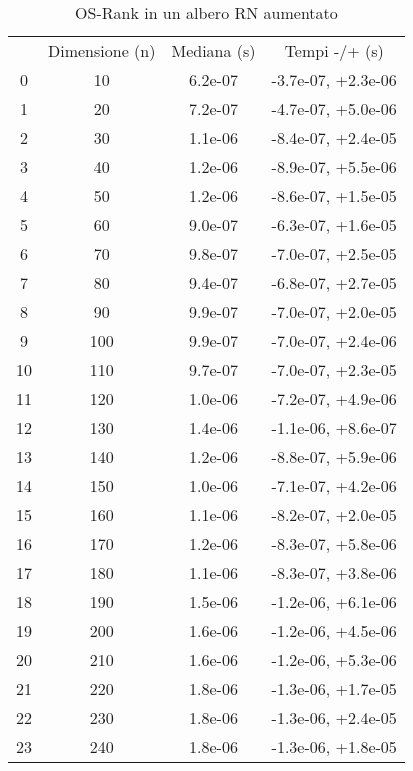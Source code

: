 \begin{table}
\centering
\caption{OS-Rank in un albero RN aumentato}
\label{OS-Rank in un albero RN aumentato}
\begin{adjustbox}{width=1\textwidth/2}
\begin{tabular}{|c|c|c|c|}
\hline
 & Dimensione (n) & Mediana (s) & Tempi -/+ (s) \\
0 & 10 & 6.2e-07 & -3.7e-07, +2.3e-06 \\
\cline{1-4}
1 & 20 & 7.2e-07 & -4.7e-07, +5.0e-06 \\
\cline{1-4}
2 & 30 & 1.1e-06 & -8.4e-07, +2.4e-05 \\
\cline{1-4}
3 & 40 & 1.2e-06 & -8.9e-07, +5.5e-06 \\
\cline{1-4}
4 & 50 & 1.2e-06 & -8.6e-07, +1.5e-05 \\
\cline{1-4}
5 & 60 & 9.0e-07 & -6.3e-07, +1.6e-05 \\
\cline{1-4}
6 & 70 & 9.8e-07 & -7.0e-07, +2.5e-05 \\
\cline{1-4}
7 & 80 & 9.4e-07 & -6.8e-07, +2.7e-05 \\
\cline{1-4}
8 & 90 & 9.9e-07 & -7.0e-07, +2.0e-05 \\
\cline{1-4}
9 & 100 & 9.9e-07 & -7.0e-07, +2.4e-06 \\
\cline{1-4}
10 & 110 & 9.7e-07 & -7.0e-07, +2.3e-05 \\
\cline{1-4}
11 & 120 & 1.0e-06 & -7.2e-07, +4.9e-06 \\
\cline{1-4}
12 & 130 & 1.4e-06 & -1.1e-06, +8.6e-07 \\
\cline{1-4}
13 & 140 & 1.2e-06 & -8.8e-07, +5.9e-06 \\
\cline{1-4}
14 & 150 & 1.0e-06 & -7.1e-07, +4.2e-06 \\
\cline{1-4}
15 & 160 & 1.1e-06 & -8.2e-07, +2.0e-05 \\
\cline{1-4}
16 & 170 & 1.2e-06 & -8.3e-07, +5.8e-06 \\
\cline{1-4}
17 & 180 & 1.1e-06 & -8.3e-07, +3.8e-06 \\
\cline{1-4}
18 & 190 & 1.5e-06 & -1.2e-06, +6.1e-06 \\
\cline{1-4}
19 & 200 & 1.6e-06 & -1.2e-06, +4.5e-06 \\
\cline{1-4}
20 & 210 & 1.6e-06 & -1.2e-06, +5.3e-06 \\
\cline{1-4}
21 & 220 & 1.8e-06 & -1.3e-06, +1.7e-05 \\
\cline{1-4}
22 & 230 & 1.8e-06 & -1.3e-06, +2.4e-05 \\
\cline{1-4}
23 & 240 & 1.8e-06 & -1.3e-06, +1.8e-05 \\

\end{tabular}
\end{adjustbox}
\end{table}
